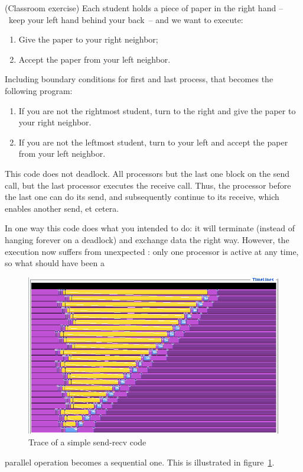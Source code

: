 \begin{exercise}
  \label{ex:serialsend}
  (Classroom exercise) Each student holds a piece of paper
  in the right hand --~keep your left hand behind your back~--
  and we want to execute:
  \begin{enumerate}
  \item Give the paper to your right neighbor;
  \item Accept the paper from your left neighbor.
  \end{enumerate}
  Including boundary conditions for first and last process, that becomes
  the following program:
  \begin{enumerate}
  \item If you are not the rightmost student, turn to the right
    and give the paper to your right neighbor.
  \item If you are not the leftmost student, turn to your left and
    accept the paper from your left neighbor.
  \end{enumerate}
\end{exercise}

This code does not deadlock. All processors but the last one block on
the send call, but the last processor executes the receive call. Thus,
the processor before the last one can do its send, and subsequently
continue to its receive, which enables another send, et cetera.

In one way this code does what you intended to do:
it will terminate (instead of hanging forever on a
deadlock) and exchange data the right way. However, the execution
now suffers from unexpected : only
one processor is active at any time, so what should have been a
%
\begin{figure}[ht]
\includegraphics[scale=.4]{graphics/linear-serial}
\caption{Trace of a simple send-recv code}
\label{fig:serialization}
\end{figure}
%
parallel operation becomes a sequential one. This is illustrated in
figure~\ref{fig:serialization}.

